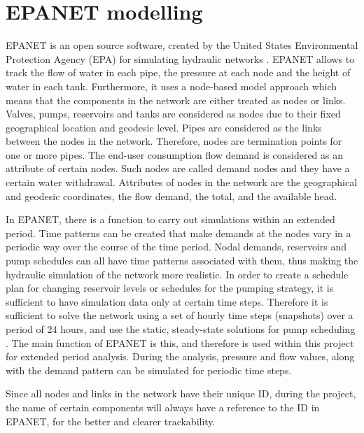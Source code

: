 \section{EPANET modelling}
\label{EPANET modelling}

EPANET is an open source software, created by the United States Environmental Protection Agency (EPA) for simulating hydraulic networks \cite{agency2016epanet}. EPANET allows to track the flow of water in each pipe, the pressure at each node and the height of water in each tank. Furthermore, it uses a node-based model approach which means that the components in the network are either treated as nodes or links. Valves, pumps, reservoirs and tanks are considered as nodes due to their fixed geographical location and geodesic level. Pipes are considered as the links between the nodes in the network. Therefore, nodes are termination points for one or more pipes. The end-user consumption flow demand is considered as an attribute of certain nodes. Such nodes are called demand nodes and they have a certain water withdrawal. Attributes of nodes in the network are the geographical and geodesic coordinates, the flow demand, the total, and the available head. \cite{agency2016epanet}  

In EPANET, there is a function to carry out simulations within an extended period. Time patterns can be created that make demands at the nodes vary in a periodic way over the course of the time period. Nodal demands, reservoirs and pump schedules can all have time patterns associated with them, thus making the hydraulic simulation of the network more realistic. In order to create a schedule plan for changing reservoir levels or schedules for the pumping strategy, it is sufficient to have simulation data only at certain time steps. Therefore it is sufficient to solve the network using a set of hourly time steps (snapshots) over a period of 24 hours, and use the static, steady-state solutions for pump scheduling \cite{agency2016epanet}. The main function of EPANET is this, and therefore is used within this project for extended period analysis. During the analysis, pressure and flow values, along with the demand pattern can be simulated for periodic time steps. 

Since all nodes and links in the network have their unique ID, during the project, the name of certain components will always have a reference to the ID in EPANET, for the better and clearer trackability. 









